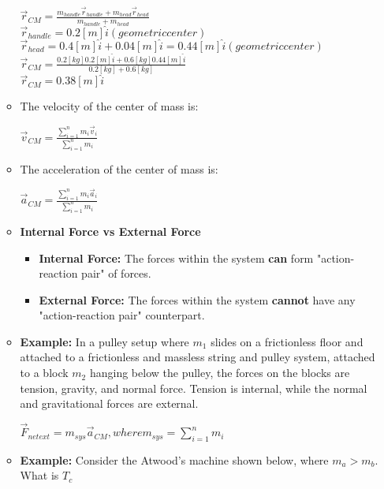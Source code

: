 \documentclass{article}
\begin{document}
\begin{enumerate}
\begin{itemize}
            $\vec{r}_{CM}=\frac{m_{handle}\vec{r}_{handle}+m_{head}\vec{r}_{head}}{m_{handle}+m_{head}}$\\
            $\vec{r}_{handle}=0.2[m]\hat{i} (geometric center)$\\
            $\vec{r}_{head}=0.4[m]\hat{i}+0.04[m]\hat{i}=0.44[m]\hat{i} (geometric center)$\\
            $\vec{r}_{CM}=\frac{0.2[kg]0.2[m]\hat{i}+0.6[kg]0.44[m]\hat{i}}{0.2[kg]+0.6[kg]}$\\
            $\vec{r}_{CM}=0.38[m]\hat{i}$  
            \item \noindent The velocity of the center of mass is:
            \begin{center}$\vec{v}_{CM}=\frac{\sum_{i=1}^{n} m_i\vec{v}_i}{\sum_{i=1}^{n} m_i}$\end{center}
            \item \noindent The acceleration of the center of mass is:
            \begin{center}$\vec{a}_{CM}=\frac{\sum_{i=1}^{n} m_i\vec{a}_i}{\sum_{i=1}^{n} m_i}$\end{center}
            \item \noindent\textbf{Internal Force vs External Force}
            \begin{itemize}
                \item \noindent\textbf{Internal Force:} The forces within the system \textbf{can} form "action-reaction pair" of forces.\\
                \item \noindent\textbf{External Force:} The forces within the system \textbf{cannot} have any "action-reaction pair" counterpart.\\
            \end{itemize}
            \item \noindent\textbf{Example:} In a pulley setup where $m_1$ slides on a frictionless floor and attached to a frictionless and massless string and pulley system, attached to a block $m_2$ hanging below the pulley, the forces on the blocks are tension, gravity, and normal force. Tension is internal, while the normal and gravitational forces are external.\\
            \begin{center}$\vec{F}_{netext}=m_{sys}\vec{a}_{CM}, where m_{sys}=\sum_{i=1}^{n}m_i$\\\end{center}
            \item \noindent\textbf{Example:} Consider the Atwood's machine shown below, where $m_a>m_b$. What is $T_c$\\

\end{itemize}
\end{enumerate}
\end{document}
